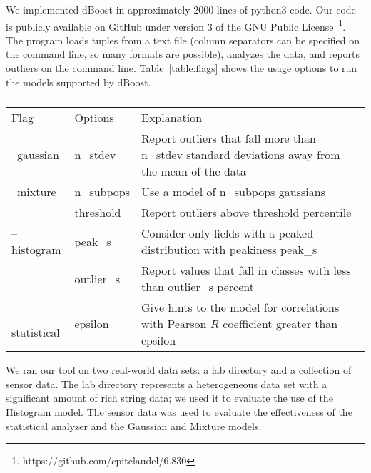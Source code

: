 
We implemented dBoost in approximately 2000 lines of python3 code.
Our code is publicly available on GitHub under version 3 of the GNU Public License~\footnote{https://github.com/cpitclaudel/6.830}.
The program loads tuples from a text file (column separators can be specified on the command line, so many formats are possible), analyzes the data, and reports outliers on the command line.
Table~\ref{table:flags} shows the usage options to run the models supported by dBoost.

\begin{table*}
  \renewcommand{\arraystretch}{1.2}
  \setlength\tabcolsep{3\tabcolsep}

\label{table:flags}
\caption{dBoost command line usage.}
\centering
\begin{tabular} { l | l | p{10cm} }
\multicolumn{3}{l}{} \\
\hline
Flag & Options & Explanation \\
\hline
--gaussian & n\_stdev & Report outliers that fall more than n\_stdev standard deviations away from the mean of the data \\
--mixture & n\_subpops & Use a model of n\_subpops gaussians \\
  & threshold & Report outliers above threshold percentile \\
--histogram & peak\_s & Consider only fields with a peaked distribution with peakiness peak\_s \\
  & outlier\_s & Report values that fall in classes with less than outlier\_s percent \\
--statistical & epsilon & Give hints to the model for correlations with Pearson $R$ coefficient greater than epsilon \\
\end{tabular}
\end{table*}

We ran our tool on two real-world data sets: a lab directory and a collection of sensor data. The lab directory represents a heterogeneous data set with a significant amount of rich string data; we used it to evaluate the use of the Histogram model. The sensor data was used to evaluate the effectiveness of the statistical analyzer and the Gaussian and Mixture models.
